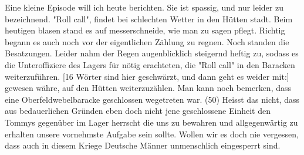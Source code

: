 \def\day{4. Oktober 1942 *}
\mktitle

Eine kleine Episode will ich heute berichten.
Sie ist spassig, und nur leider zu bezeichnend.
"Roll call", findet bei schlechten Wetter in den H\"{u}tten stadt.
Beim heutigen blasen stand es auf messerschneide, wie man zu sagen pflegt.
Richtig begann es auch noch vor der eigentlichen Z\"{a}hlung zu regnen.
Noch standen die Besatzungen.
Leider nahm der Regen augenblicklich steigernd heftig zu, sodass es die Unteroffiziere des Lagers f\"{u}r n\"{o}tig erachteten, die "Roll call" in den Baracken weiterzuf\"{u}hren.
{\color{red} [16 W\"{o}rter sind hier geschw\"{a}rzt, und dann geht es weider mit:] }
gewesen w\"{a}hre, auf den H\"{u}tten weiterzuz\"{a}hlen.
Man kann noch bemerken, dass eine Oberfeldwebelbaracke geschlossen wegetreten war. (50)
Heisst das nicht, dass aus bedauerlichen Gr\"{u}nden eben doch nicht jene geschlossene Einheit den Tommys gegen\"{u}ber im Lager herrscht die uns zu bewahren und allgegenw\"{a}rtig zu erhalten unsere vornehmste Aufgabe sein sollte.
Wollen wir es doch nie vergessen, dass auch in diesem Kriege Deutsche M\"{a}nner unmenschlich eingesperrt sind.

\clearpage
